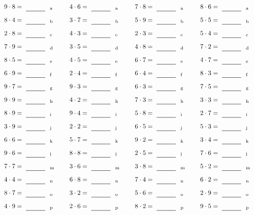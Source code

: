 \documentclass
[
  draft    = true,
  fontsize = 11pt,
  parskip  = half-
]
{scrartcl}
\begin{document}
\par\vfill\par
\begin{align*}
    \pline{9\cdot8}&=\rline{a}
  & \pline{4\cdot6}&=\rline{a}
  & \pline{7\cdot8}&=\rline{a}
  & \pline{8\cdot6}&=\rline{a} \\[1ex]
    \pline{8\cdot4}&=\rline{b}
  & \pline{3\cdot7}&=\rline{b}
  & \pline{5\cdot9}&=\rline{b}
  & \pline{5\cdot5}&=\rline{b} \\[1ex]
    \pline{2\cdot8}&=\rline{c}
  & \pline{4\cdot3}&=\rline{c}
  & \pline{2\cdot3}&=\rline{c}
  & \pline{5\cdot4}&=\rline{c} \\[1ex]
    \pline{7\cdot9}&=\rline{d}
  & \pline{3\cdot5}&=\rline{d}
  & \pline{4\cdot8}&=\rline{d}
  & \pline{7\cdot2}&=\rline{d} \\[1ex]
    \pline{8\cdot5}&=\rline{e}
  & \pline{4\cdot5}&=\rline{e}
  & \pline{6\cdot7}&=\rline{e}
  & \pline{4\cdot7}&=\rline{e} \\[1ex]
    \pline{6\cdot9}&=\rline{f}
  & \pline{2\cdot4}&=\rline{f}
  & \pline{6\cdot4}&=\rline{f}
  & \pline{8\cdot3}&=\rline{f} \\[1ex]
    \pline{9\cdot7}&=\rline{g}
  & \pline{9\cdot3}&=\rline{g}
  & \pline{6\cdot3}&=\rline{g}
  & \pline{7\cdot5}&=\rline{g} \\[1ex]
    \pline{9\cdot9}&=\rline{h}
  & \pline{4\cdot2}&=\rline{h}
  & \pline{7\cdot3}&=\rline{h}
  & \pline{3\cdot3}&=\rline{h} \\[1ex]
    \pline{8\cdot9}&=\rline{i}
  & \pline{9\cdot4}&=\rline{i}
  & \pline{5\cdot8}&=\rline{i}
  & \pline{2\cdot7}&=\rline{i} \\[1ex]
    \pline{3\cdot9}&=\rline{j}
  & \pline{2\cdot2}&=\rline{j}
  & \pline{6\cdot5}&=\rline{j}
  & \pline{5\cdot3}&=\rline{j} \\[1ex]
    \pline{6\cdot6}&=\rline{k}
  & \pline{5\cdot7}&=\rline{k}
  & \pline{9\cdot2}&=\rline{k}
  & \pline{3\cdot4}&=\rline{k} \\[1ex]
    \pline{9\cdot6}&=\rline{l}
  & \pline{8\cdot8}&=\rline{l}
  & \pline{2\cdot5}&=\rline{l}
  & \pline{7\cdot6}&=\rline{l} \\[1ex]
    \pline{7\cdot7}&=\rline{m}
  & \pline{3\cdot6}&=\rline{m}
  & \pline{3\cdot8}&=\rline{m}
  & \pline{5\cdot2}&=\rline{m} \\[1ex]
    \pline{4\cdot4}&=\rline{n}
  & \pline{6\cdot8}&=\rline{n}
  & \pline{7\cdot4}&=\rline{n}
  & \pline{6\cdot2}&=\rline{n} \\[1ex]
    \pline{8\cdot7}&=\rline{o}
  & \pline{3\cdot2}&=\rline{o}
  & \pline{5\cdot6}&=\rline{o}
  & \pline{2\cdot9}&=\rline{o} \\[1ex]
    \pline{4\cdot9}&=\rline{p}
  & \pline{2\cdot6}&=\rline{p}
  & \pline{8\cdot2}&=\rline{p}
  & \pline{9\cdot5}&=\rline{p}
\end{align*}
\end{document}
